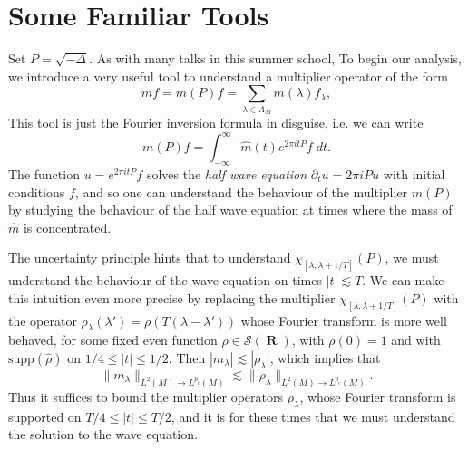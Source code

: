 \documentclass{article}
\DeclareMathOperator{\RR}{\mathbf{R}}
\theoremstyle{plain}
\theoremstyle{remark}
\theoremstyle{definition}
\begin{document}




\section{Some Familiar Tools}

Set $P = \sqrt{-\Delta}$. As with many talks in this summer school, To begin our analysis, we introduce a very useful tool to understand a multiplier operator of the form
%
\[ m f = m \left( P \right) f = \sum_{\lambda \in \Lambda_M} m(\lambda) f_\lambda, \]
%
This tool is just the Fourier inversion formula in disguise, i.e. we can write
%
\[ m \left( P \right) f = \int_{-\infty}^\infty \widehat{m}(t) e^{2 \pi i t P} f\; dt. \]
%
The function $u = e^{2 \pi i t P} f$ solves the \emph{half wave equation} $\partial_t u = 2 \pi i P u$ with initial conditions $f$, and so one can understand the behaviour of the multiplier $m(P)$ by studying the behaviour of the half wave equation at times where the mass of $\widehat{m}$ is concentrated.

The uncertainty principle hints that to understand $\chi_{[\lambda,\lambda + 1/T]}(P)$, we must understand the behaviour of the wave equation on times $|t| \lesssim T$. We can make this intuition even more precise by replacing the multiplier $\chi_{[\lambda,\lambda + 1/T]}(P)$ with the operator $\rho_\lambda(\lambda') = \rho(T(\lambda - \lambda'))$ whose Fourier transform is more well behaved, for some fixed even function $\rho \in \mathcal{S}(\RR)$, with $\rho(0) = 1$ and with $\text{supp}(\widehat{\rho})$ on $1/4 \leq |t| \leq 1/2$. Then $|m_\lambda| \lesssim |\rho_\lambda|$, which implies that
%
\[ \| m_\lambda \|_{L^2(M) \to L^{p_c}(M)} \lesssim \| \rho_\lambda \|_{L^2(M) \to L^{p_c}(M)}. \]
%
Thus it suffices to bound the multiplier operators $\rho_\lambda$, whose Fourier transform is supported on $T/4 \leq |t| \leq T/2$, and it is for these times that we must understand the solution to the wave equation.
\end{document}
